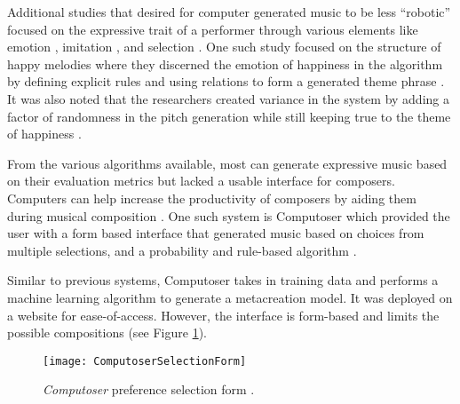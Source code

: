 Additional studies that desired for computer generated music to be less ``robotic'' focused on the expressive trait of a performer through various elements like emotion \citep{bresin2000emotional}, imitation \citep{miranda2010artificial}, and selection \citep{ramirez2008genetic}. One such study focused on the structure of happy melodies where they discerned the emotion of happiness in the algorithm by defining explicit rules and using relations to form a generated theme phrase \citep{cao2015automatic}. It was also noted that the researchers created variance in the system by adding a factor of randomness in the pitch generation while still keeping true to the theme of happiness \citep{cao2015automatic}. 

From the various algorithms available, most can generate expressive music based on their evaluation metrics \citep{cao2015automatic,bresin2000emotional,miranda2010artificial,de2012playing,ramirez2008genetic,miranda2010artificial} but lacked a usable interface for composers. Computers can help increase the productivity of composers by aiding them during musical composition \citep{velardo2016study}. One such system is Computoser which provided the user with a form based interface that generated music based on choices from multiple selections, and a probability and rule-based algorithm \citep{bozhanov2014computoser}. 

Similar to previous systems, Computoser takes in training data and performs a machine learning algorithm to generate a metacreation model. It was deployed on a website for ease-of-access. However, the interface is form-based and limits the possible compositions (see Figure \ref{fig:computoser-preference}). 

\begin{comment}
One such tool is the Abjad API, an open source software for Python. The tool assists users in creating a musical score by expanding the Python programming language with additional functions that can be used in Python programs \citep{baca2015abjad}. Despite its availability, the tool can only be used by users knowledgeable in the Python programming language and is inaccessible to composers who cannot code. To open computational creativity into a wider audience of composers, there is a need to have a usable interface that does not require any knowledge other than a general understanding of music composition.
\end{comment}

\begin{figure}[H]
    \centering
	\texttt{[image: ComputoserSelectionForm]}
    \caption{\textit{Computoser} preference selection form \citep{bozhanov2014computoser}.}
    \label{fig:computoser-preference}
\end{figure}

